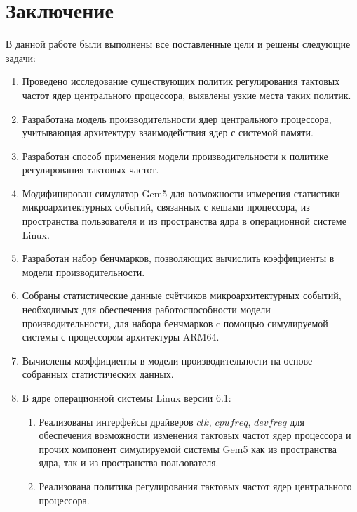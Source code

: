 \section{Заключение}
\label{sec:Section5} 

    В данной работе были выполнены все поставленные цели и решены следующие задачи:
    \begin{enumerate}
        \item Проведено исследование существующих политик регулирования тактовых частот ядер
        центрального процессора, выявлены узкие места таких политик.
        \item Разработана модель производительности ядер центрального процессора, учитывающая архитектуру
        взаимодействия ядер с системой памяти.
        \item Разработан способ применения модели производительности к политике регулирования тактовых частот.
        \item Модифицирован симулятор Gem5 для возможности измерения статистики микроархитектурных событий,
        связанных с кешами процессора, из пространства пользователя и из пространства ядра в операционной
        системе Linux.
        \item Разработан набор бенчмарков, позволяющих вычислить коэффициенты в модели производительности.
        \item Собраны статистические данные счётчиков микроархитектурных событий, необходимых для обеспечения
        работоспособности модели производительности, для набора бенчмарков c помощью симулируемой системы с
        процессором архитектуры ARM64.
        \item Вычислены коэффициенты в модели производительности на основе собранных статистических данных.
        \item В ядре операционной системы Linux версии 6.1:
        \begin{enumerate}
            \item Реализованы интерфейсы драйверов $clk$, $cpufreq$, $devfreq$ для обеспечения возможности
            изменения тактовых частот ядер процессора и прочих компонент симулируемой системы Gem5
            как из пространства ядра, так и из пространства пользователя.
            \item Реализована политика регулирования тактовых частот ядер центрального процессора.
        \end{enumerate}
    \end{enumerate}

